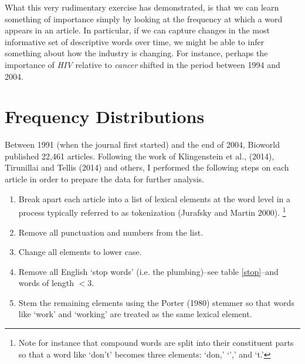 What this very rudimentary exercise has demonstrated, is that we can learn something of importance simply by looking at the frequency at which a word appears in an article. In particular, if we can capture changes in the most informative set of descriptive words over time, we might be able to infer something about how the industry is changing. For instance, perhaps the importance of \emph{HIV} relative to \emph{cancer} shifted in the period between 1994 and 2004.

\section{Frequency Distributions}

Between 1991 (when the journal first started) and the end of 2004, Bioworld published 22,461 articles. Following the work of Klingenstein et al., (2014), Tirunillai and Tellis (2014) and others, I performed the following steps on each article in order to prepare the data for further analysis.
\begin{enumerate}
  \item Break apart each article into a list of lexical elements at the word level in a process typically referred to as tokenization (Jurafsky and Martin 2000). \footnote{Note for instance that compound words are split into their constituent parts so that a word like `don't' becomes three elements: `don,' `',' and `t.'}
  \item Remove all punctuation and numbers from the list.
  \item Change all elements to lower case.
  \item Remove all English `stop words' (i.e. the plumbing)--see table \ref{stop}--and words of length $< 3$.
  \item Stem the remaining elements using the Porter (1980) stemmer so that words like `work' and `working' are treated as the same lexical element.
\end{enumerate}

